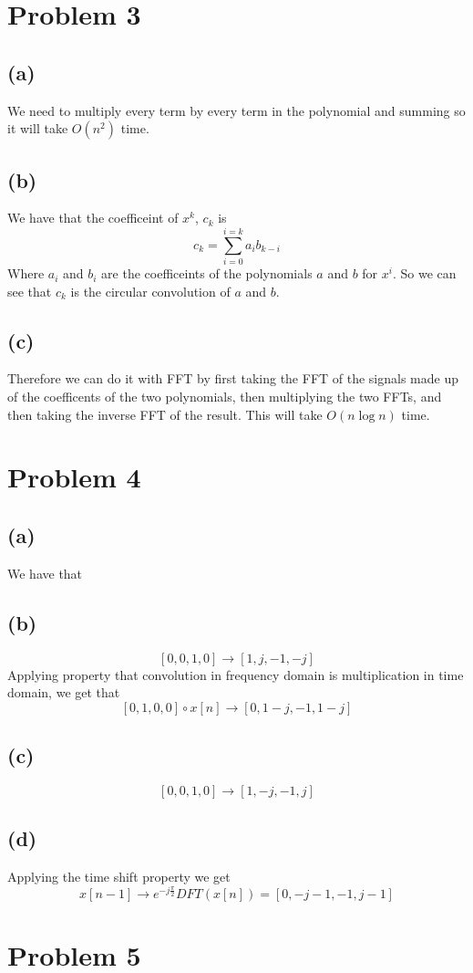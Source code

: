 \section*{Problem 3}
\subsection*{(a)}
We need to multiply every term by every term in the polynomial and summing 
so it will take $O(n^2)$ time.
\subsection*{(b)}
We have that the coefficeint of $x^k$, $c_k$ is 
$$c_k=\sum_{i=0}^{i=k}a_ib_{k-i}$$
Where $a_i$ and $b_i$ are the coefficeints of the polynomials $a$ and $b$ for 
$x^i$. So we can see that $c_k$ is the circular convolution of $a$ and $b$.
\subsection*{(c)}
Therefore we can do it with FFT by first taking the FFT
of the signals made up of the coefficents of the two polynomials, 
then multiplying the two FFTs, and then taking the inverse FFT of the
result. This will take $O(n\log n)$ time.
\section*{Problem 4}
\subsection*{(a)}
We have that 
\subsection*{(b)}
$$[0,0,1,0]\to[1,j,-1,-j]$$
Applying property that convolution in frequency domain is multiplication in time domain, we get that
$$[0,1,0,0]\circ x[n]\to [0,1-j,-1,1-j]$$
\subsection*{(c)}
$$[0,0,1,0]\to[1,-j,-1,j]$$
\subsection*{(d)}
Applying the time shift property we get
$$x[n-1]\to e^{-j\frac{\pi}{2}}DFT(x[n])=[0,-j-1,-1,j-1]$$
\section*{Problem 5}


